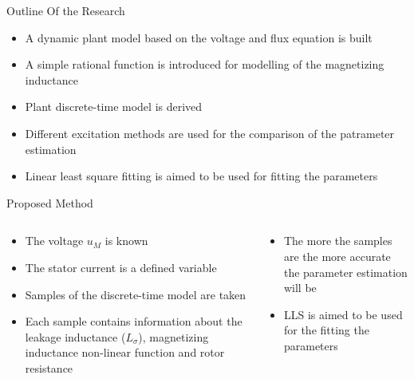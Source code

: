 \documentclass[11pt,aspectratio=169]{beamer}
\begin{document}
\begin{frame}{Outline Of the Research}
    \begin{itemize}
        \item A dynamic plant model based on the voltage and flux equation is built
        \item A simple rational function is introduced for modelling of the magnetizing inductance
        \item Plant discrete-time model is derived
        \item Different excitation methods are used for the comparison of the patrameter estimation
        \item Linear least square fitting is aimed to be used for fitting the parameters
    \end{itemize}
\end{frame}
\begin{frame}{Proposed Method}
\begin{columns}
\begin{column}{.43\textwidth}
\begin{itemize}
    \item The voltage $u_{M}$  is known
    \item The stator current %
    is a defined variable
    \item Samples of the discrete-time model are taken
    \item Each sample contains information about the leakage inductance ($L_{\sigma}$), magnetizing inductance  non-linear function and rotor resistance
    \end{itemize}
\end{column}
\begin{column}{.53\textwidth}
\begin{center}

    \end{center}
    \begin{itemize}
    \item The more the samples are the more accurate the parameter estimation will be
     \item LLS is aimed to be used for the fitting the parameters
     \end{itemize}
    \end{column}
    \end{columns}
\end{frame}
\end{document}
